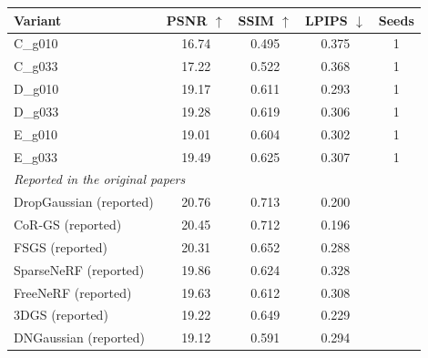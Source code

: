 \begin{tabular}{lcccc}
\toprule
Variant & PSNR $\uparrow$ & SSIM $\uparrow$ & LPIPS $\downarrow$ & Seeds \\
\midrule
C_g010 & 16.74 & 0.495 & 0.375 & 1 \\
C_g033 & 17.22 & 0.522 & 0.368 & 1 \\
D_g010 & 19.17 & 0.611 & 0.293 & 1 \\
D_g033 & 19.28 & 0.619 & 0.306 & 1 \\
E_g010 & 19.01 & 0.604 & 0.302 & 1 \\
E_g033 & 19.49 & 0.625 & 0.307 & 1 \\
\midrule
\multicolumn{5}{l}{\textit{Reported in the original papers}} \\
DropGaussian (reported) & 20.76 & 0.713 & 0.200 &  \\
CoR-GS (reported) & 20.45 & 0.712 & 0.196 &  \\
FSGS (reported) & 20.31 & 0.652 & 0.288 &  \\
SparseNeRF (reported) & 19.86 & 0.624 & 0.328 &  \\
FreeNeRF (reported) & 19.63 & 0.612 & 0.308 &  \\
3DGS (reported) & 19.22 & 0.649 & 0.229 &  \\
DNGaussian (reported) & 19.12 & 0.591 & 0.294 &  \\
\bottomrule
\end{tabular}
